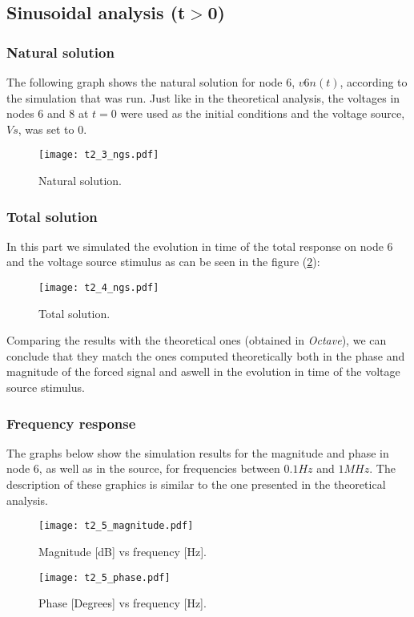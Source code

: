\subsection{Sinusoidal analysis (t$>$0)}

\subsubsection{Natural solution}

The following graph shows the natural solution for node $6$, $v{6n}\left(t\right)$,
 according to the simulation that was run. Just like in the theoretical analysis, 
 the voltages in nodes $6$ and $8$ at $t=0$ were used as the initial conditions
  and the voltage source, $V{s}$, was set to $0$.
  
\begin{figure}[h] \centering
  \texttt{[image: t2\_3\_ngs.pdf]}
  \caption{Natural solution.}
  \label{fig:nsg3}
\end{figure}

\newpage

\subsubsection{Total solution}

In this part we simulated the evolution in time of the total response on node 6 and the voltage source
stimulus as can be seen in the figure (\ref{fig:ngs4}):

\begin{figure}[h] \centering
  \texttt{[image: t2\_4\_ngs.pdf]}
  \caption{Total solution.}
  \label{fig:ngs4}
\end{figure}

Comparing the results with the theoretical ones (obtained in \emph{Octave}), we can conclude that
they match the ones computed theoretically both in the phase and magnitude of the forced signal and
aswell in the evolution in time of the voltage source stimulus.

\newpage

\subsubsection{Frequency response}
The graphs below show the simulation results for the magnitude and phase in node 6,
 as well as in the source, for frequencies between $0.1 Hz$ and $1 MHz$. 
 The description of these graphics is similar to the one presented in the theoretical analysis.

\begin{figure}[h] \centering
  \texttt{[image: t2\_5\_magnitude.pdf]}
  \caption{Magnitude [dB] vs frequency [Hz].}
  \label{fig:ngs5m}
\end{figure}

\newpage

\begin{figure}[h] \centering
  \texttt{[image: t2\_5\_phase.pdf]}
  \caption{Phase [Degrees] vs frequency [Hz].}
  \label{fig:ngs5p}
\end{figure}